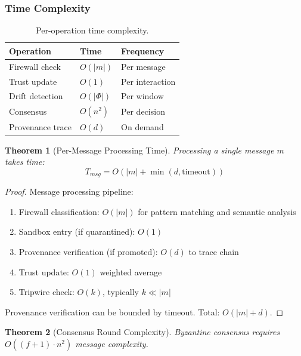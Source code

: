 \documentclass[
]{article}
\newtheorem{theorem}{Theorem}[section]
\begin{document}
\subsubsection{Time Complexity}\label{sec:time-complexity}

\begin{table}[htbp]
\centering
\caption{Per-operation time complexity.}
\label{tab:time-components}
\begin{tabular}{@{}lll@{}}
\toprule
Operation & Time & Frequency \\
\midrule
Firewall check & $O(|m|)$ & Per message \\
Trust update & $O(1)$ & Per interaction \\
Drift detection & $O(|\Phi|)$ & Per window \\
Consensus & $O(n^2)$ & Per decision \\
Provenance trace & $O(d)$ & On demand \\
\bottomrule
\end{tabular}
\end{table}

\begin{theorem}[Per-Message Processing Time]
\label{thm:message-time}
Processing a single message $m$ takes time:
\begin{equation}
\label{eq:message-processing}
T_{msg} = O(|m| + \min(d, \text{timeout}))
\end{equation}
\end{theorem}

\begin{proof}
Message processing pipeline:
\begin{enumerate}
\item Firewall classification: $O(|m|)$ for pattern matching and semantic analysis
\item Sandbox entry (if quarantined): $O(1)$
\item Provenance verification (if promoted): $O(d)$ to trace chain
\item Trust update: $O(1)$ weighted average
\item Tripwire check: $O(k)$, typically $k \ll |m|$
\end{enumerate}

Provenance verification can be bounded by timeout. Total: $O(|m| + d)$.
\end{proof}

\begin{theorem}[Consensus Round Complexity]
\label{thm:consensus-complexity}
Byzantine consensus requires $O((f+1) \cdot n^2)$ message complexity.
\end{theorem}
\end{document}

